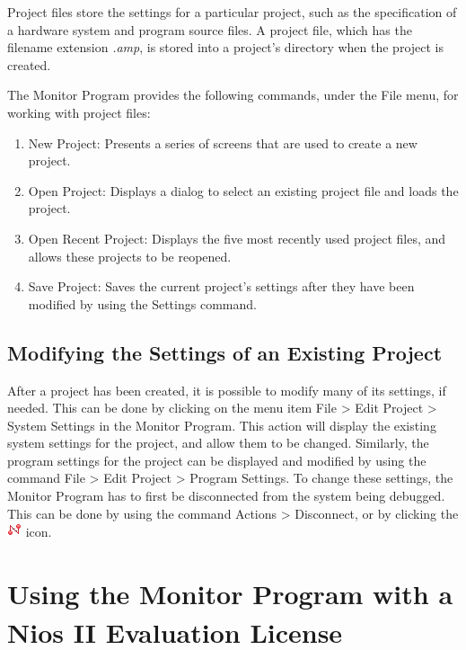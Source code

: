\documentclass[11pt, twoside, pdftex]{article}
\begin{document}
Project files store the settings for a particular project, 
such as the specification of a hardware system and program source
files. A project file, which has the filename 
extension {\it .amp}, is stored into a project's directory when
the project is created. 

The Monitor Program provides the following commands, under the
{\sf File} menu, for working with project files:

\begin{enumerate}
    \item {\sf New Project}: Presents a series of screens that are used to create a new project.
    \item {\sf Open Project}: Displays a dialog to select an
existing project file and loads the project.
    \item {\sf Open Recent Project}:  Displays the five most recently used project files, and allows these projects to be
reopened.
    \item {\sf Save Project}: Saves the current project's
settings after they have been modified by using 
the {\sf Settings} command.
\end{enumerate}

\subsection{Modifying the Settings of an Existing Project}

After a project has been created, it is possible to modify many
of its settings, if needed. This can be done by clicking
on the menu item {\sf File > Edit Project > System Settings} in the Monitor
Program.
This action will display the existing system settings for the
project, and allow them to be changed. Similarly, the program
settings for the project can be displayed and modified by using
the command {\sf File > Edit Project > Program Settings}. To change
these settings, the Monitor Program has to first be disconnected
from the system being debugged. This can be done by using the
command {\sf Actions > Disconnect}, or by clicking the
\includegraphics{toolbar/disconnect.png} icon.


\section{Using the Monitor Program with a Nios\textsuperscript{\textregistered} II Evaluation License}
\label{sec:custom_system}
\end{document}
